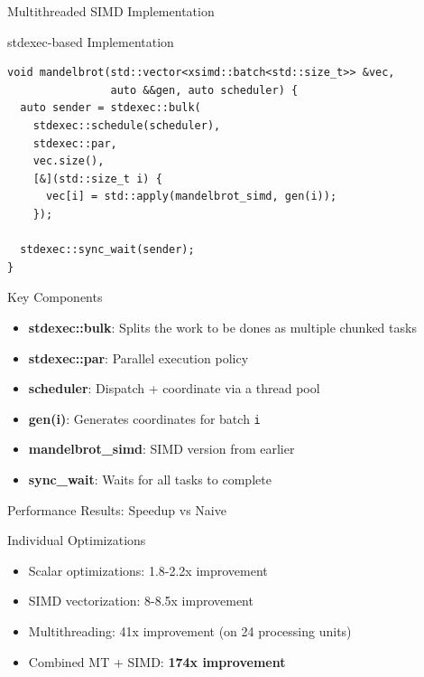 \documentclass{beamer}
\begin{document}
\begin{frame}[fragile]{Multithreaded SIMD Implementation}
    \begin{exampleblock}{stdexec-based Implementation}
        \begin{verbatim}
void mandelbrot(std::vector<xsimd::batch<std::size_t>> &vec, 
                auto &&gen, auto scheduler) {
  auto sender = stdexec::bulk(
    stdexec::schedule(scheduler), 
    stdexec::par, 
    vec.size(), 
    [&](std::size_t i) {
      vec[i] = std::apply(mandelbrot_simd, gen(i));
    });

  stdexec::sync_wait(sender);
}
        \end{verbatim}
    \end{exampleblock}
    
    \begin{block}{Key Components}
        \begin{itemize}
            \item \textbf{stdexec::bulk}: Splits the work to be dones as multiple chunked tasks
            \item \textbf{stdexec::par}: Parallel execution policy
            \item \textbf{scheduler}: Dispatch + coordinate via a thread pool
            \item \textbf{gen(i)}: Generates coordinates for batch \texttt{i}
            \item \textbf{mandelbrot\_simd}: SIMD version from earlier
            \item \textbf{sync\_wait}: Waits for all tasks to complete
        \end{itemize}
    \end{block}
\end{frame}

\begin{frame}{Performance Results: Speedup vs Naive}
    \begin{block}{Individual Optimizations}
        \begin{itemize}
            \item Scalar optimizations: 1.8-2.2x improvement
            \item SIMD vectorization: 8-8.5x improvement
            \item Multithreading: 41x improvement (on 24 processing units)
            \item Combined MT + SIMD: \textbf{174x improvement}
        \end{itemize}
    \end{block}
\end{frame}
\end{document}
